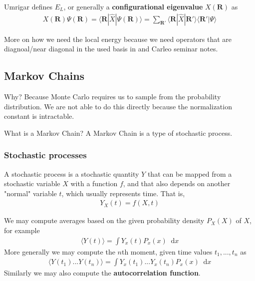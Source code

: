 \documentclass[twoside,english]{uiofysmaster}
\newcommand*\dif{\mathop{}\!\mathrm{d}}
\begin{document}
Umrigar \cite{Umrigar1999} defines $E_L$, or generally a \textbf{configurational eigenvalue} $X (\bm{R})$ as
\begin{align}
	X(\bm{R}) \Psi(\bm{R}) = \langle \bm{R} | \hat{X} | \Psi(\bm{R}) \rangle
	 = \sum_{\bm{R}'} \langle \bm{R} | \hat{X} | \bm{R}' \rangle \langle \bm{R}' | \Psi \rangle
\end{align}

More on how we need the local energy because we need operators that are diagnoal/near diagonal in the used basis in 
\cite{Umrigar1999} and Carleo seminar notes.

\subsection{Markov Chains}
Why? Because Monte Carlo requires us to sample from the probability distribution. We are not able to do this directly because the normalization constant is intractable. 

What is a Markov Chain?
A Markov Chain is a type of stochastic process. 

\subsubsection{Stochastic processes}
A stochastic process is a stochastic quantity $Y$ that can be mapped from a stochastic variable $X$ with a function $f$, and that also depends on another "normal" variable $t$, which usually represents time. That is,
\begin{align}
	Y_X (t) = f(X, t)
\end{align}

We may compute averages based on the given probability density $P_X(X)$ of $X$, for example
\begin{align}
	\langle Y(t) \rangle = \int Y_x (t) P_x(x) \dif x
\end{align}
More generally we may compute the $n$th moment, given time values $t_1,...,t_n$ as
\begin{align}
	\langle Y(t_1) ... Y(t_n) \rangle = \int Y_x(t_1) ... Y_x(t_n) P_x (x) \dif x 
\end{align}
Similarly we may also compute the \textbf{autocorrelation function}.
\end{document}
